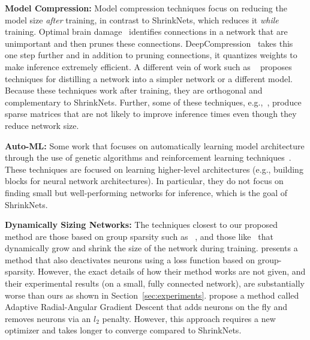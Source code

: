 
\noindent\textbf{Model Compression: }Model compression techniques focus on
reducing the model size \emph{after} training, in contrast to ShrinkNets, which
reduces it \emph{while} training. 
Optimal brain damage~\cite{Cun} identifies connections in a network that are
unimportant and then prunes these connections.
DeepCompression~\cite{han2015deepcompression} takes this one step further and in
addition to pruning connections, it quantizes weights to make inference
extremely efficient.  A different vein of work such as ~\cite{romero2014fitnets,
hinton2015distilling} proposes techniques for distilling a network into a
simpler network or a different model. Because these techniques work after
training, they are orthogonal and complementary to ShrinkNets. Further,
some of these techniques, e.g.,~\cite{Han2015,Cun}, produce sparse matrices that
are not likely to improve inference times even though they reduce network size.

\noindent\textbf{Auto-ML: } Some work that focuses on automatically learning
model architecture through the use of genetic algorithms and reinforcement
learning techniques~\cite{DBLP:journals/corr/ZophL16, zoph2017learning}. These
techniques are focused on learning higher-level architectures (e.g.,
building blocks for neural network architectures). In particular, they do not
focus on finding small but well-performing networks for inference, which is the
goal of ShrinkNets.

\noindent\textbf{Dynamically Sizing Networks: }The techniques closest to our
proposed method are those based on group sparsity such as
~\cite{Scardapane2017}, and those like~\cite{Philipp} that dynamically grow and shrink
 the size of the network during training.  \cite{Scardapane2017}
presents a method that also deactivates neurons using a loss function based on
group-sparsity.  However, the exact details of how their method works are not
given, and their experimental results (on a small, fully connected network), are
substantially worse than ours as shown in Section~\ref{sec:experiments}.
\cite{Philipp} propose a method called Adaptive Radial-Angular Gradient Descent
that adds neurons on the fly and removes neurons via an $l_2$ penalty.  However,
this approach requires a new optimizer and takes longer to converge compared to
ShrinkNets.



